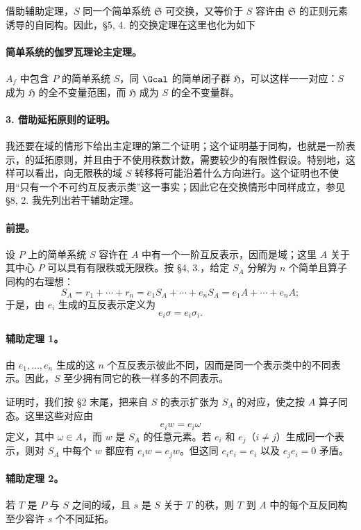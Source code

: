 借助辅助定理，\(S\) 同一个简单系统 \(\mathfrak S\) 可交换，又等价于 \(S\) 容许由 \(\mathfrak S\) 的正则元素诱导的自同构。因此，§5, 4. 的交换定理在这里也化为如下

\paragraph{简单系统的伽罗瓦理论主定理。}
\(A_f\) 中包含 \(P\) 的简单系统 \(S\)，同 \(\Gcal\) 的简单闭子群 \(\mathfrak H\)，可以这样一一对应：\(S\) 成为 \(\mathfrak H\) 的全不变量范围，而 \(\mathfrak H\) 成为 \(S\) 的全不变量群。

\paragraph{3. 借助延拓原则的证明。}
我还要在域的情形下给出主定理的第二个证明；这个证明基于同构，也就是一阶表示，的延拓原则，并且由于不使用秩数计数，需要较少的有限性假设。特别地，这样可以看出，向无限秩的域 \(S\) 转移将可能沿着什么方向进行。这个证明也不使用“只有一个不可约互反表示类”这一事实；因此它在交换情形中同样成立，参见 §8, 2. 我先列出若干辅助定理。

\paragraph{前提。}
设 \(P\) 上的简单系统 \(S\) 容许在 \(A\) 中有一个一阶互反表示，因而是域；这里 \(A\) 关于其中心 \(P\) 可以具有有限秩或无限秩。按 §4, 3.，给定 \(S_A\) 分解为 \(n\) 个简单且算子同构的右理想：
\[
        S_A=r_1+\cdots+r_n
            =e_1S_A+\cdots+e_nS_A
            =e_1A+\cdots+e_nA ;
\]
于是，由 \(e_i\) 生成的互反表示定义为
\[
        e_i\sigma=e_i\sigma_i .
\]

\paragraph{辅助定理 1。}
由 \(e_1,\ldots,e_n\) 生成的这 \(n\) 个互反表示彼此不同，因而是同一个表示类中的不同表示。因此，\(S\) 至少拥有同它的秩一样多的不同表示。

证明时，我们按 §2 末尾，把来自 \(S\) 的表示扩张为 \(S_A\) 的对应，使之按 \(A\) 算子同态。这里这些对应由
\[
        e_i w=e_i\omega
\]
定义，其中 \(\omega\in A\)，而 \(w\) 是 \(S_A\) 的任意元素。若 \(e_i\) 和 \(e_j\)（\(i\ne j\)）生成同一个表示，则对 \(S_A\) 中每个 \(w\) 都应有 \(e_iw=e_jw\)。但这同 \(e_ie_i=e_i\) 以及 \(e_je_i=0\) 矛盾。

\paragraph{辅助定理 2。}
若 \(T\) 是 \(P\) 与 \(S\) 之间的域，且 \(s\) 是 \(S\) 关于 \(T\) 的秩，则 \(T\) 到 \(A\) 中的每个互反同构至少容许 \(s\) 个不同延拓。

